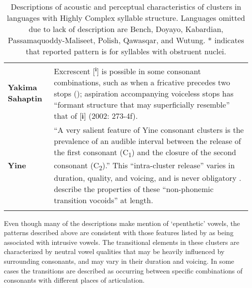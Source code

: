 \begin{table}
\begin{tabularx}{\textwidth}{XX}
\textbf{Yakima Sahaptin} & Excrescent [\textsuperscript{ɨ}] is possible in some consonant combinations, such as when a fricative precedes two stops (\citealt{HargusBeavert2002}); aspiration accompanying voiceless stops has “formant structure that may superficially resemble” that of [ɨ] (2002: 273-4f).\\
\textbf{Yine} & “A very salient feature of Yine consonant clusters is the prevalence of an audible interval between the release of the first consonant (C\textsubscript{1}) and the closure of the second consonant (C\textsubscript{2}).” This “intra-cluster release” varies in duration, quality, and voicing, and is never obligatory \citep[28-9]{Hanson2010}. \citet{MattesonPike1958} describe the properties of these “non-phonemic transition vocoids” at length.\\
\lspbottomrule
\end{tabularx}
\caption{\label{tab:3.17cont} Descriptions of acoustic and perceptual characteristics of clusters in languages with Highly Complex syllable structure. Languages omitted due to lack of description are Bench, Doyayo, Kabardian, Passamaquoddy-Maliseet, Polish, Qawasqar, and Wutung. * indicates that reported pattern is for syllables with obstruent nuclei.}
\end{table}

  Even though many of the descriptions make mention of ‘epenthetic’ vowels, the patterns described above are consistent with those features listed by \citet{Hall2006} as being associated with intrusive vowels. The transitional elements in these clusters are characterized by neutral vowel qualities that may be heavily influenced by surrounding consonants, and may vary in their duration and voicing. In some cases the transitions are described as occurring between specific combinations of consonants with different places of articulation.

